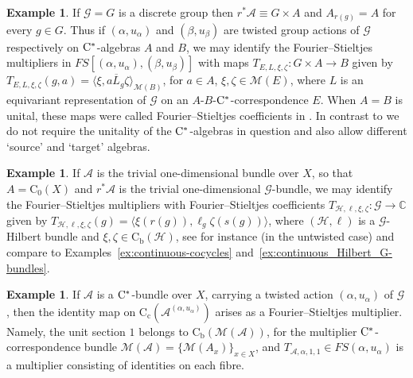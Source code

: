 \documentclass[11 pt, leqno]{amsart}
\numberwithin{equation}{section}
\theoremstyle{plain}
\theoremstyle{definition}
\newtheorem{ex}[thm]{Example}
\newcommand*{\contc}{\mathrm{C_c}}%
\newcommand*{\contz}{\mathrm{C_0}}%
\newcommand*{\contb}{\mathrm{C_b}}%
\renewcommand{\H}{\mathcal H}
\newcommand{\M}{\mathcal M}
\newcommand{\G}{\mathcal G} %
\newcommand{\EE}{\mathcal E}
\newcommand{\A}{\mathcal A}
\newcommand{\C}{\mathbb C}
\newcommand{\cst}{\ifmmode\mathrm{C}^*\else{$\mathrm{C}^*$}\fi}
\begin{document}

\begin{ex} 
If $\G = G$ is a discrete group then $r^*\A \equiv  G\times A$ and $A_{r(g)}=A$ for every $g\in G$. 
Thus if $(\alpha,u_{\alpha})$ and $(\beta, u_{\beta})$ are twisted group actions of $\G$ respectively on $\cst$-algebras $A$ and $B$, we may identify the Fourier--Stieltjes multipliers in $FS[(\alpha,u_{\alpha}),  (\beta, u_{\beta})]$ with maps $T_{E,L,\xi,\zeta} : G\times A \to B$ given by $T_{E,L,\xi,\zeta}(g,a)=\langle \xi, a \overline{L}_{g}\zeta\rangle_{\M(B)}$, for $a\in A$, $\xi,\zeta \in \M(E)$, where $L$ is an equivariant representation of $\G$ on an $A$-$B$-$\cst$-correspondence $E$. 
When $A=B$ is unital, these maps were called  Fourier--Stieltjes coefficients in \cite{BedosConti}. 
In contrast to \cite{BedosConti} we do not require the unitality of the $\cst$-algebras in question and also allow different `source' and `target' algebras.   
\end{ex}

\begin{ex} \label{ex:FS groupoid}
If $\A$ is the trivial one-dimensional bundle over $X$, so that $A=\contz(X)$ and $r^*\A$ is the trivial one-dimensional $\G$-bundle, we may identify the Fourier--Stieltjes multipliers with Fourier--Stieltjes coefficients $T_{\H, \ell,\xi,\zeta}:\G \to \C$ given by $T_{\H,\ell,\xi,\zeta}(g)=\langle \xi(r(g)), \ell_g\zeta(s(g))\rangle$, where $(\H, \ell)$ is a $\G$-Hilbert bundle and $\xi,\zeta \in \contb(\H)$, see for instance \cite{Paterson} (in the untwisted case) and compare to Examples~\ref{ex:continuous-cocycles} and~\ref{ex:continuous_Hilbert_G-bundles}. 
\end{ex}

\begin{ex}\label{ex:identity_multiplier} 
If $\A$ is a $\cst$-bundle over $X$, carrying a twisted action $(\alpha,u_\alpha)$ of $\G$, then the identity map on $\contc(\A^{(\alpha,u_{\alpha})})$ arises as
a Fourier--Stieltjes multiplier. 
Namely, the unit section $1$ belongs to $\contb(\M(\A))$, for the multiplier $\cst$-correspondence bundle $\M(\A)=\{\M(A_x)\}_{x\in X}$, and $T_{\A,\alpha,1,1}\in FS(\alpha,u_{\alpha})$ is a  multiplier consisting of identities on each fibre. 
\end{ex}
\end{document}
